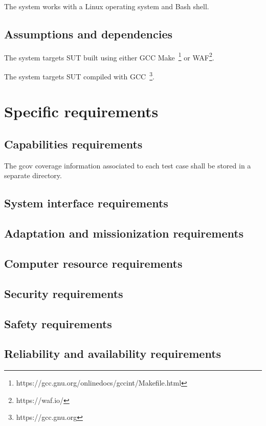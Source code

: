 \RQ{} The system works with a Linux operating system and Bash shell.



\subsection{Assumptions and dependencies}

\RQ{} The system targets SUT built using either GCC Make~\footnote{https://gcc.gnu.org/onlinedocs/gccint/Makefile.html} or WAF\footnote{https://waf.io/}.

\RQ{} The system targets SUT compiled with GCC~\footnote{https://gcc.gnu.org}.

\section{Specific requirements}
\subsection{Capabilities requirements}

\RQ{} The gcov coverage information associated to each test case shall be stored in a separate directory.

\subsection{System interface requirements}
\subsection{Adaptation and missionization requirements }
\subsection{Computer resource requirements}
\subsection{Security requirements }
\subsection{Safety requirements}
\subsection{Reliability and availability requirements}
